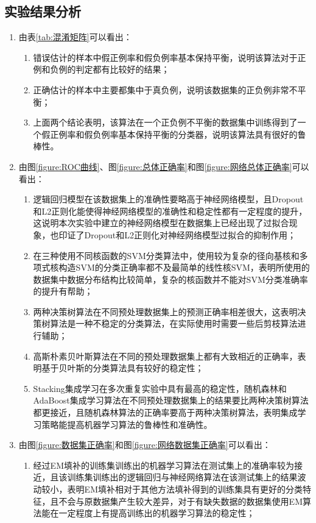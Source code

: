 \documentclass[a4paper]{ctexart}
\begin{document}
\subsection{实验结果分析}
\begin{enumerate}
	\item 由表\ref{tab:混淆矩阵}可以看出：
	\begin{enumerate}[label=\alph*)]
		\item 错误估计的样本中假正例率和假负例率基本保持平衡，说明该算法对于正例和负例的判定都有比较好的结果；
		\item 正确估计的样本中主要都集中于真负例，说明该数据集的正负例非常不平衡；
		\item 上面两个结论表明，该算法在一个正负例不平衡的数据集中训练得到了一个假正例率和假负例率基本保持平衡的分类器，说明该算法具有很好的鲁棒性。
	\end{enumerate}
	\item 由图\ref{figure:ROC曲线}、图\ref{figure:总体正确率}和图\ref{figure:网络总体正确率}可以看出：
	      \begin{enumerate}[label=\alph*)]
		      \item 逻辑回归模型在该数据集上的准确性要略高于神经网络模型，且Dropout和L2正则化能使得神经网络模型的准确性和稳定性都有一定程度的提升，这说明本次实验中建立的神经网络模型在数据集上已经出现了过拟合现象，也印证了Dropout和L2正则化对神经网络模型过拟合的抑制作用；
		      \item 在三种使用不同核函数的SVM分类算法中，使用较为复杂的径向基核和多项式核构造SVM的分类正确率都不及最简单的线性核SVM，表明所使用的数据集中数据分布结构比较简单，复杂的核函数并不能对SVM分类准确率的提升有帮助；
		      \item 两种决策树算法在不同预处理数据集上的预测正确率相差很大，这表明决策树算法是一种不稳定的分类算法，在实际使用时需要一些后剪枝算法进行辅助；
			  \item 高斯朴素贝叶斯算法在不同的预处理数据集上都有大致相近的正确率，表明基于贝叶斯的分类算法具有较好的稳定性；
			  \item Stacking集成学习在多次重复实验中具有最高的稳定性，随机森林和AdaBoost集成学习算法在不同预处理数据集上的结果要比两种决策树算法都更接近，且随机森林算法的正确率要高于两种决策树算法，表明集成学习策略能提高机器学习算法的鲁棒性和准确性。
	      \end{enumerate}
	\item 由图\ref{figure:数据集正确率}和图\ref{figure:网络数据集正确率}可以看出：
	      \begin{enumerate}[label=\alph*)]
		      \item 经过EM填补的训练集训练出的机器学习算法在测试集上的准确率较为接近，且该训练集训练出的逻辑回归与神经网络算法在该测试集上的结果波动较小，表明EM填补相对于其他方法填补得到的训练集具有更好的分类特征，且不会与原数据集产生较大差异，对于有缺失数据的数据集使用EM算法能在一定程度上有提高训练出的机器学习算法的稳定性；

\end{enumerate}
\end{enumerate}
\end{document}
